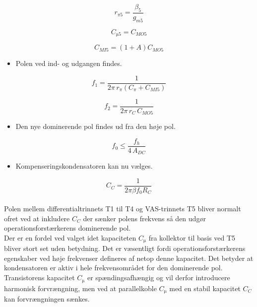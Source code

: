 \documentclass[danish]{article}
\begin{document}
\begin{equation} 
r_{\pi 5} = \frac{\beta_5}{g_{m5}}
\end{equation}

\begin{equation} 
C_{\si{\micro}5} = C_{MO5}
\end{equation}

\begin{equation} 
C_{MI5} = (1+A)C_{MO5}
\end{equation}

\begin{itemize}
	\item Polen ved ind- og udgangen findes.
\end{itemize}

\begin{equation} 
f_1 = \dfrac{1}{2\pi \, r_{\pi} (C_{\pi} + C_{MI5})}
\end{equation}

\begin{equation} 
f_2 = \dfrac{1}{2\pi \, r_C \, C_{MO5}}
\end{equation}

\begin{itemize}
	\item Den nye dominerende pol findes ud fra den høje pol.
\end{itemize}

\begin{equation} 
f_0  \leq \frac{f_h}{4\,A_{DC}}
\end{equation}

\begin{itemize}
	\item Kompenseringskondensatoren kan nu vælges.
\end{itemize}

\begin{equation} 
C_C  = \frac{1}{2\pi \beta f_0 R_C}
\end{equation}
\\

Polen mellem differentialtrinnets T1 til T4 og VAS-trinnets T5 bliver normalt ofret ved at inkludere $C_C$ der sænker polens frekvens så den udgør operationsforstærkerens dominerende pol. \\

Der er en fordel ved valget idet kapaciteten $C_{\si{\micro}}$ fra kollektor til basis ved T5 bliver stort set uden betydning. 
Det er væsentligt fordi operationsforstærkerens egenskaber ved høje frekvenser defineres af netop denne kapacitet.
Det betyder at kondensatoren er aktiv i hele frekvensområdet for den dominerende pol. 
Transistorens kapacitet $C_{\si{\micro}}$ er spændingsafhængig og vil derfor introducere harmonisk forvrængning, men ved at parallelkoble $C_{\si{\micro}}$ med en stabil kapacitet $C_C$ kan forvrængningen sænkes. \\
 
\end{document}
